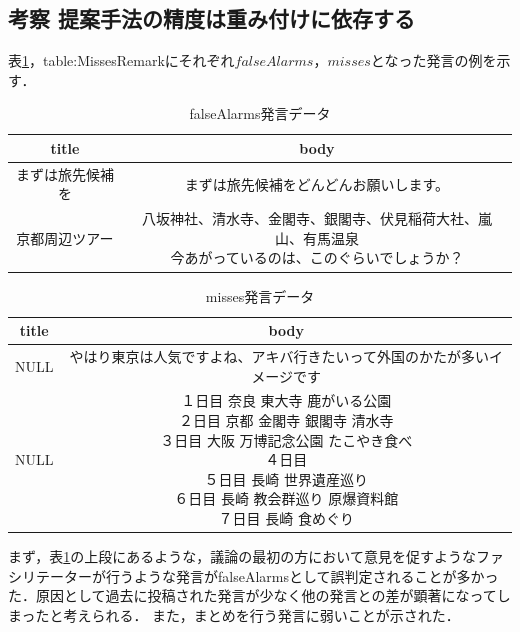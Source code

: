 \subsection*{考察 提案手法の精度は重み付けに依存する}
表\ref{table:FalseAlarmsRemark}，{table:MissesRemark}にそれぞれ$falseAlarms$，$misses$となった発言の例を示す．
\begin{table}[htbp]
  \begin{tabular}{| c |  c |} \hline
     title & body \\ \hline
     まずは旅先候補を&まずは旅先候補をどんどんお願いします。\\ \hline
     京都周辺ツアー & \shortstack{八坂神社、清水寺、金閣寺、銀閣寺、伏見稲荷大社、嵐山、有馬温泉\\
 今あがっているのは、このぐらいでしょうか？}\\
     \hline
  \end{tabular}
  \caption{falseAlarms発言データ} \label{table:FalseAlarmsRemark}
\end{table}
\begin{table}[htbp]
\begin{center}
  \begin{tabular}{| c | c |} \hline
     title & body \\ \hline
     NULL&やはり東京は人気ですよね、アキバ行きたいって外国のかたが多いイメージです\\ \hline
     NULL &  \shortstack{１日目 奈良 東大寺 鹿がいる公園\\
 ２日目 京都 金閣寺 銀閣寺 清水寺\\
 ３日目 大阪 万博記念公園 たこやき食べ\\
 ４日目\\
 ５日目 長崎 世界遺産巡り\\
 ６日目 長崎 教会群巡り 原爆資料館\\
 ７日目 長崎 食めぐり}\\
     \hline
  \end{tabular}
  \caption{misses発言データ} \label{table:MissesRemark}
  \end{center}
\end{table}
まず，表\ref{table:FalseAlarmsRemark}の上段にあるような，議論の最初の方において意見を促すようなファシリテーターが行うような発言がfalseAlarmsとして誤判定されることが多かった．原因として過去に投稿された発言が少なく他の発言との差が顕著になってしまったと考えられる．
また，まとめを行う発言に弱いことが示された．

